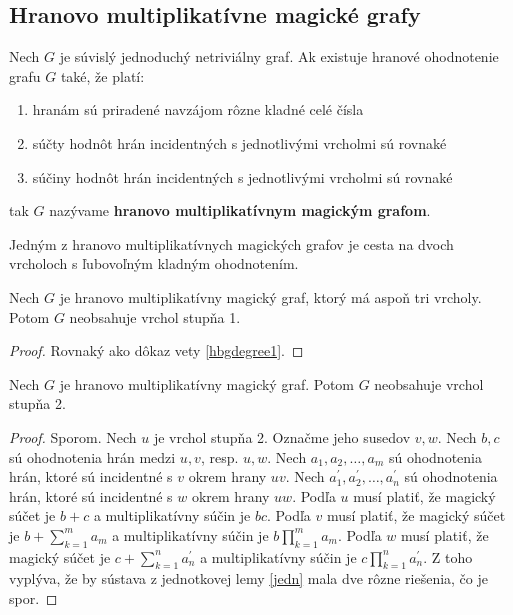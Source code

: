 \subsection{Hranovo multiplikatívne magické grafy}

\begin{definition} Nech $G$ je súvislý jednoduchý netriviálny graf. Ak existuje hranové ohodnotenie grafu $G$ také, že platí:

\begin{enumerate}
\item hranám sú priradené navzájom rôzne kladné celé čísla
\item súčty hodnôt hrán incidentných s jednotlivými vrcholmi sú rovnaké
\item súčiny hodnôt hrán incidentných s jednotlivými vrcholmi sú rovnaké
\end{enumerate}

tak $G$ nazývame \textbf{hranovo multiplikatívnym magickým grafom}.
\end{definition} 

Jedným z hranovo multiplikatívnych magických grafov je cesta na dvoch vrcholoch s ľubovoľným kladným ohodnotením.

\begin{theorem} Nech $G$ je hranovo multiplikatívny magický graf, ktorý má aspoň tri vrcholy. Potom $G$ neobsahuje vrchol stupňa 1.
\end{theorem}

\begin{proof} Rovnaký ako dôkaz vety \ref{hbgdegree1}.
\end{proof}

\begin{theorem} Nech $G$ je hranovo multiplikatívny magický graf. Potom $G$ neobsahuje vrchol stupňa 2.
\end{theorem}

\begin{proof} Sporom. Nech $u$ je vrchol stupňa 2. Označme jeho susedov $v,w$. Nech $b,c$ sú ohodnotenia hrán medzi $u,v$, resp. $u,w$. Nech $a_1, a_2, \dots , a_m$ sú ohodnotenia hrán, ktoré sú incidentné s $v$ okrem hrany $uv$. Nech $a_1^\prime, a_2^\prime, \dots , a_n^\prime$ sú ohodnotenia hrán, ktoré sú incidentné s $w$ okrem hrany $uw$. Podľa $u$ musí platiť, že magický súčet je $b+c$ a multiplikatívny súčin je $bc$. Podľa $v$ musí platiť, že magický súčet je $b + \sum_{k=1}^{m} a_m$ a multiplikatívny súčin je $b \prod_{k=1}^{m} a_m$. Podľa $w$ musí platiť, že magický súčet je $c + \sum_{k=1}^{n} a_n^\prime$ a multiplikatívny súčin je $c  \prod_{k=1}^{n} a_n^\prime$. Z toho vyplýva, že by sústava z jednotkovej lemy \ref{jedn} mala dve rôzne riešenia, čo je spor.
\end{proof}

